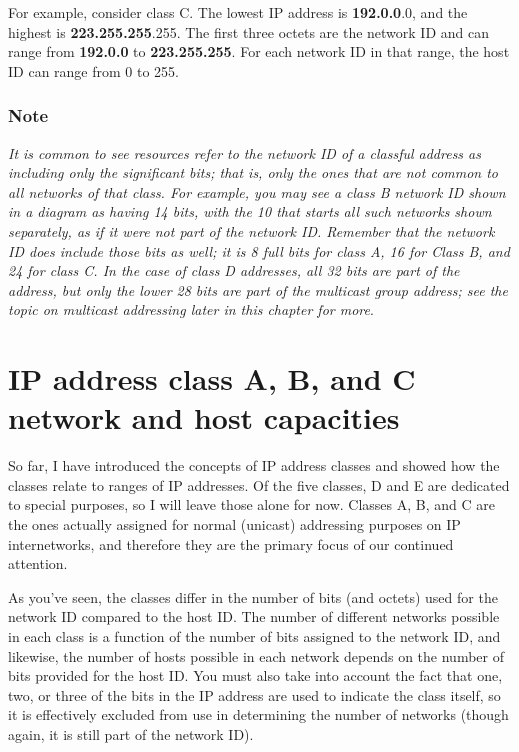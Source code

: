 For example, consider class C. The lowest IP address is
{\textbf{192.0.0}}.0, and the highest is {\textbf{223.255.255}}.255. The
first three octets are the network ID and can range from
{\textbf{192.0.0}} to {\textbf{223.255.255}}. For each network ID in
that range, the host ID can range from 0 to 255.

\subsubsection[Note]{\texorpdfstring{\protect\hypertarget{ch17s02.htmlux5cux23note-65}{}{}Note}{Note}}

{\emph{It is common to see resources refer to the network ID of a
classful address as including only the significant bits; that is, only
the ones that are not common to all networks of that class. For example,
you may see a class B network ID shown in a diagram as having 14 bits,
with the 10 that starts all such networks shown separately, as if it
were not part of the network ID. Remember that the network ID does
include those bits as well; it is 8 full bits for class A, 16 for Class
B, and 24 for class C. In the case of class D addresses, all 32 bits are
part of the address, but only the lower 28 bits are part of the
multicast group address; see the topic on multicast addressing later in
this chapter for more}}.


\section{IP address class A, B, and C network and host capacities}

So far, I have introduced the concepts of IP address classes and showed
how the classes relate to ranges of IP addresses. Of the five classes, D
and E are dedicated to special purposes, so I will leave those alone for
now. Classes A, B, and C are the ones actually assigned for normal
(unicast) addressing purposes on IP internetworks, and therefore they
are the primary focus of our continued attention.

As you've seen, the classes differ in the number of bits (and octets)
used for the network ID compared to the host ID. The number of different
networks possible in each class is a function of the number of bits
assigned to the network ID, and likewise, the number of hosts possible
in each network depends on the number of bits provided for the host ID.
You must also take into account the fact that one, two, or three of the
bits in the IP address are used to indicate the class itself, so it is
effectively excluded from use in determining the number of networks
(though again, it is still part of the network ID).

